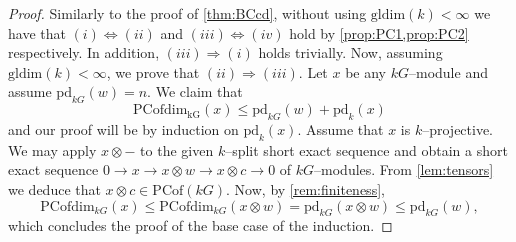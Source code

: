 \documentclass{amsart}
\numberwithin{equation}{section}%
\theoremstyle{remark}
\begin{document}
{\begin{proof}
Similarly to the proof of \cref{thm:BCcd}, without using $\mathrm{gldim}(k)<\infty$ we have that $(i)\Leftrightarrow (ii)$ and $(iii)\Leftrightarrow (iv)$ hold by \cref{prop:PC1,prop:PC2}  respectively. In addition, $(iii)\Rightarrow (i)$ holds trivially. Now, assuming $\mathrm{gldim}(k)<\infty$, we prove that $(ii)\Rightarrow (iii)$. Let $x$ be any $kG$--module and assume $\mathrm{pd}_{kG}(w)=n.$ We claim that 
\[
\mathrm{PCofdim_{kG}}(x)\leqslant \mathrm{pd}_{kG}(w)+\mathrm{pd}_{k}(x)
\]
and our proof will be by induction on $\mathrm{pd}_{k}(x)$. Assume that $x$ is $k$--projective. We may apply $x\otimes -$ to the given $k$--split short exact sequence and obtain a short exact sequence $0\rightarrow x\rightarrow x\otimes w\rightarrow x\otimes c\rightarrow 0$ of $kG$--modules. From \cref{lem:tensors} we deduce that $x\otimes c\in\mathrm{PCof}(kG)$. 
Now, by \cref{rem:finiteness},
\[
\mathrm{PCofdim}_{kG}(x)\leqslant\mathrm{PCofdim}_{kG}(x\otimes w)=\mathrm{pd}_{kG}(x\otimes w)\leqslant\mathrm{pd}_{kG}(w),
\]
which concludes the proof of the base case of the induction.


\end{proof}}
\end{document}
